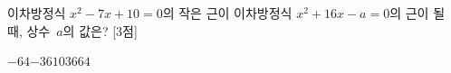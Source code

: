 이차방정식 $x^2-7x+10=0$의 작은 근이 이차방정식 $x^2+16x-a=0$의 근이 될 때, 상수~$a$의 값은? \mbox{[3점]}
\begin{choices32}{$-64$}{$-36$}{$10$}{$36$}{$64$}\end{choices32}
